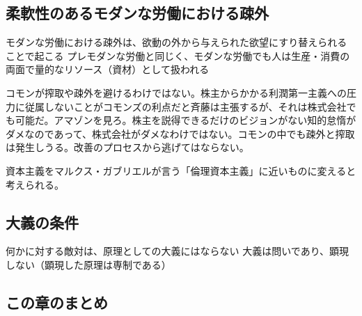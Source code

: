 \subsection{柔軟性のあるモダンな労働における疎外}\label{ux67d4ux8edfux6027ux306eux3042ux308bux30e2ux30c0ux30f3ux306aux52b4ux50cdux306bux304aux3051ux308bux758eux5916}

モダンな労働における疎外は、欲動の外から与えられた欲望にすり替えられることで起こる
プレモダンな労働と同じく、モダンな労働でも人は生産・消費の両面で量的なリソース（資材）として扱われる

コモンが搾取や疎外を避けるわけではない。株主からかかる利潤第一主義への圧力に従属しないことがコモンズの利点だと斉藤は主張するが、それは株式会社でも可能だ。アマゾンを見ろ。株主を説得できるだけのビジョンがない知的怠惰がダメなのであって、株式会社がダメなわけではない。コモンの中でも疎外と搾取は発生しうる。改善のプロセスから逃げてはならない。

資本主義をマルクス・ガブリエルが言う「倫理資本主義」に近いものに変えると考えられる。

\subsection{大義の条件}\label{ux5927ux7fa9ux306eux6761ux4ef6}

何かに対する敵対は、原理としての大義にはならない
大義は問いであり、顕現しない（顕現した原理は専制である）

\subsection{この章のまとめ}\label{ux3053ux306eux7ae0ux306eux307eux3068ux3081}

